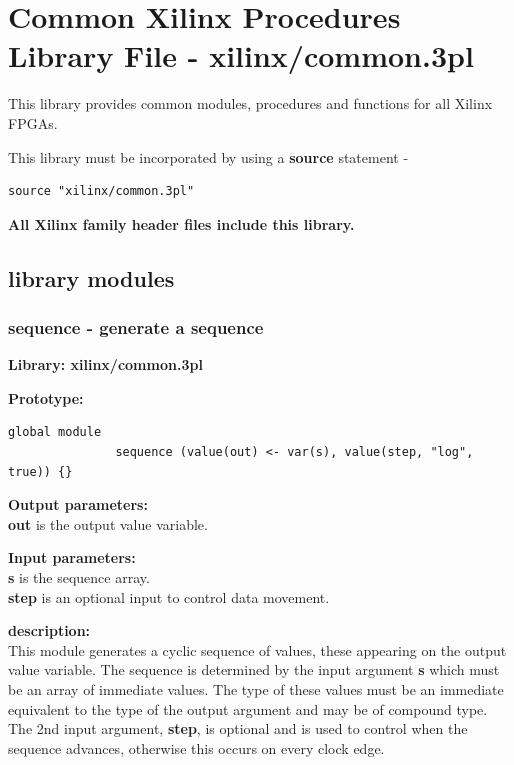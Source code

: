 \pagebreak

\section{Common Xilinx Procedures Library File - xilinx/common.3pl}

    This library provides common modules, procedures and functions for
    all Xilinx FPGAs.
    
    This library must be incorporated by using a {\bf source} statement -
    \begin{lstlisting}[gobble=4, language=threepl]
       source "xilinx/common.3pl"
    \end{lstlisting}
    
    {\bf All Xilinx family header files include this library.}



    \subsection{library modules}
    


        \subsubsection{sequence - generate a sequence}\label{sec:lmsequence}
            
            {\bf Library: xilinx/common.3pl}

            {\bf Prototype:} \\
            \vsp
            \begin{lstlisting}[gobble=12, language=threepl]
               global module
               sequence (value(out) <- var(s), value(step, "log", true)) {}
            \end{lstlisting}

            {\bf Output parameters:} \\
            {\bf out} is the output value variable.

            {\bf Input parameters:} \\
            {\bf s} is the sequence array.\\
            {\bf step} is an optional input to control data movement.

            {\bf description:} \\
            This module generates a cyclic sequence of values, these
            appearing on the output value variable. The sequence is
            determined by the input argument {\bf s} which must be an
            array of immediate values. The type of these values must be
            an immediate equivalent to the type of the output argument
            and may be of compound type. The 2nd input argument, {\bf step},
            is optional and is used to control when the sequence advances,
            otherwise this occurs on every clock edge.




